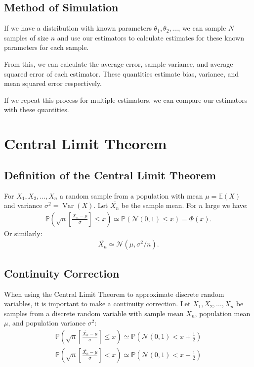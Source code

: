 \documentclass[a4paper, 12pt, twoside]{article}
\DeclareMathOperator{\Var}{Var}
\begin{document}
\subsection{Method of Simulation}

If we have a distribution with known parameters $\theta_1, \theta_2,
    \ldots$, we can sample $N$ samples of size $n$ and use our estimators
to calculate estimates for these known parameters for each sample.

\vspace{\baselineskip}

From this, we can calculate the average error, sample variance, and
average squared error of each estimator. These quantities estimate
bias, variance, and mean squared error respectively.

\vspace{\baselineskip}

If we repeat this process for multiple estimators, we can compare
our estimators with these quantities.

\section{Central Limit Theorem}

\subsection{Definition of the Central Limit Theorem}

For $X_1, X_2, \ldots, X_n$ a random sample from a population with
mean $\mu = \mathbb{E}(X)$ and variance $\sigma^2 = \Var(X)$. Let
$\overline{X_n}$ be the sample mean. For $n$ large we have:
\begin{align*}
    \mathbb{P}\left( \sqrt{n}
    \left[\frac{\overline{X_n} - \mu}{\sigma}\right]
    \leq x \right) \simeq \mathbb{P}(\mathcal{N}(0, 1) \leq x) = \Phi(x).
\end{align*}
Or similarly:
\begin{align*}
    \overline{X_n} \simeq \mathcal{N}(\mu, \sigma^2/n).
\end{align*}

\subsection{Continuity Correction}

When using the Central Limit Theorem to approximate discrete random
variables, it is important to make a continuity correction. Let
$X_1, X_2, \ldots, X_n$ be samples from a discrete random variable
with sample mean $\overline{X_n}$, population mean $\mu$, and
population variance $\sigma^2$:
\begin{align*}
    \mathbb{P}\left( \sqrt{n}
    \left[\frac{\overline{X_n} - \mu}{\sigma}\right]
    \leq x \right) \simeq \mathbb{P}(\mathcal{N}(0, 1)
    < x + \frac{1}{2}) \\
    \mathbb{P}\left( \sqrt{n}
    \left[\frac{\overline{X_n} - \mu}{\sigma}\right]
    < x \right) \simeq \mathbb{P}(\mathcal{N}(0, 1)
    < x - \frac{1}{2})
\end{align*}
\end{document}
